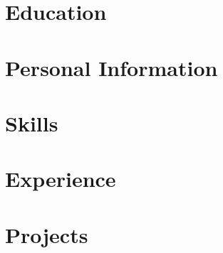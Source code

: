 \documentclass{fortythree_resume}
\begin{document}

\begin{minipage}[t]{0.33\textwidth}

\section{Education}
\sectionsep

\section{Personal Information}
\sectionsep

\section{Skills}
\sectionsep

\end{minipage}
\hfill
\begin{minipage}[t]{0.66\textwidth} 

\section{Experience}
\sectionsep

\section{Projects}
\sectionsep

\end{minipage}
\end{document}

